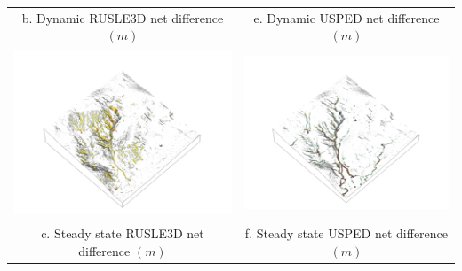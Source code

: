\documentclass{standalone}
\begin{document}
\begin{tabular}{m{} m{}}
\multicolumn{1}{c}{b. Dynamic RUSLE3D net difference $(m)$} & 
\multicolumn{1}{c}{e. Dynamic USPED net difference $(m)$}\\
%
\multicolumn{1}{c}{\includegraphics[height=50mm]{../../images/ss_rusle_3d/net_difference.png}} &
\multicolumn{1}{c}{\includegraphics[height=50mm]{../../images/ss_usped_3d/net_difference.png}}\\
\multicolumn{1}{c}{c. Steady state RUSLE3D net difference $(m)$} & 
\multicolumn{1}{c}{f. Steady state USPED net difference $(m)$}\\
%
\end{tabular}

\end{document}

